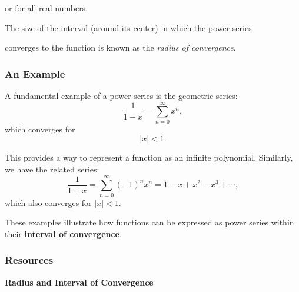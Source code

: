 or for all real numbers.


The size of the interval (around its center) in which the power series

converges to the function is known as the \textit{radius of convergence}.


\subsubsection{An Example}
\label{sss:anex-9765}

A fundamental example of a power series is the geometric series:
\[
\frac{1}{1 - x} = \sum_{n=0}^{\infty} x^n,
\]
which converges for
\[
|x| < 1.
\]

This provides a way to represent a function as an infinite polynomial.  
Similarly, we have the related series:
\[
\frac{1}{1 + x} = \sum_{n=0}^{\infty} (-1)^n x^n
= 1 - x + x^2 - x^3 + \cdots,
\]
which also converges for $|x| < 1$.

\medskip

These examples illustrate how functions can be expressed as power series 
within their \textbf{interval of convergence}.

\subsubsection{Resources}
\label{sss:reso-power}

\textbf{Radius and Interval of Convergence}

